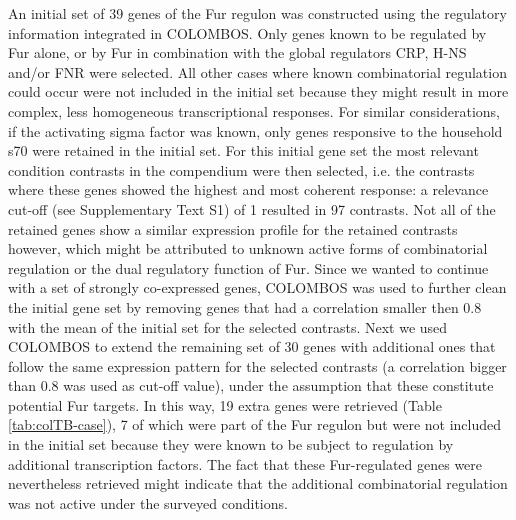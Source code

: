 An initial set of 39 genes of the Fur regulon was constructed using the 
regulatory information integrated in COLOMBOS. Only genes known to be regulated 
by Fur alone, or by Fur in combination with the global regulators CRP, H-NS 
and/or FNR were selected. All other cases where known combinatorial regulation 
could occur were not included in the initial set because they might result in 
more complex, less homogeneous transcriptional responses. For similar 
considerations, if the activating sigma factor was known, only genes responsive 
to the household s70 were retained in the initial set. For this initial gene 
set the most relevant condition contrasts in the compendium were then selected, 
i.e. the contrasts where these genes showed the highest and most coherent 
response: a relevance cut-off (see Supplementary Text S1) of 1 resulted in 97 
contrasts. Not all of the retained genes show a similar expression profile for 
the retained contrasts however, which might be attributed to unknown active 
forms of combinatorial regulation or the dual regulatory function of Fur. Since 
we wanted to continue with a set of strongly co-expressed genes, COLOMBOS was 
used to further clean the initial gene set by removing genes that had a 
correlation smaller then 0.8 with the mean of the initial set for the selected 
contrasts. Next we used COLOMBOS to extend the remaining set of 30 genes with 
additional ones that follow the same expression pattern for the selected 
contrasts (a correlation bigger than 0.8 was used as cut-off value), under the 
assumption that these constitute potential Fur targets. In this way, 19 extra 
genes were retrieved (Table \ref{tab:colTB-case}), 7 of which were part of the 
Fur regulon but were not included in the initial set because they were known to 
be subject to regulation by additional transcription factors. The fact that 
these Fur-regulated genes were nevertheless retrieved might indicate that the 
additional combinatorial regulation was not active under the surveyed 
conditions.


